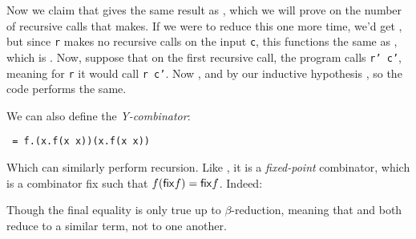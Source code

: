 Now we claim that  gives the same result as , which we will prove on the number of recursive calls that  makes.
If we were to reduce this one more time, we'd get , but since {\tt r} makes no recursive calls on the input {\tt c}, this functions the same as ,
which is .
Now, suppose that on the first recursive call, the program calls {\tt r' c'}, meaning for {\tt r} it would call {\tt r c'}.
Now , and by our inductive hypothesis , so the code performs the same.

We can also define the {\it Y-combinator}:

\medskip
\centerline{\tt\Y\ = \lambda f.(\lambda x.f(x x))(\lambda x.f(x x))}

Which can similarly perform recursion.
Like , it is a {\it fixed-point} combinator, which is a combinator {\sf fix} such that $f({\sf fix}f)={\sf fix}f$.
Indeed:

\medskip
{}

Though the final equality is only true up to $\beta$-reduction, meaning that  and  both reduce to a similar term, not to one another.


